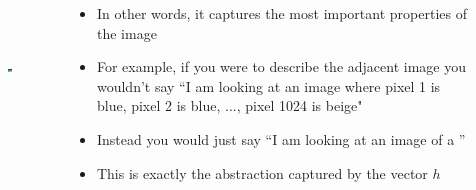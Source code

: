 \begin{frame}
	\begin{columns}
		\begin{overlayarea}{\textwidth}{\textheight}
		\begin{figure}
		\includegraphics[height=100pt,width=100pt]{images/cloudybeach1}
		\end{figure}
		\end{overlayarea}
		\begin{overlayarea}{\textwidth}{\textheight}
			\begin{itemize}\justifying
				\item<1-> In other words, it captures the most important properties of the image
				\item<2-> For example, if you were to describe the adjacent image you wouldn't say ``I am  looking at an image where pixel 1 is blue, pixel 2 is blue, ..., pixel 1024 is beige"
				\item<3->Instead you would just say ``I am looking at an image of a \color{red}{sunny beach} \color{black}{with an} \color{red}{ocean} \color{black}{in the background and} \color{red}{beige sand}\color{black}''
				\item<4->This is exactly the abstraction captured by the vector $h$
			\end{itemize}
		\end{overlayarea}
	\end{columns}
\end{frame}

